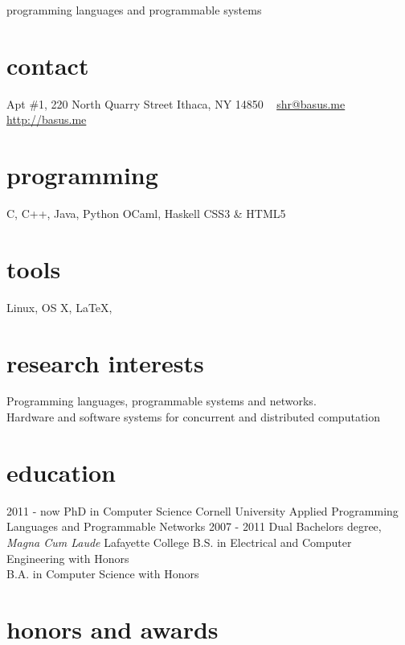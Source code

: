 \documentclass[print]{cv}
\begin{document}
       {programming languages and programmable systems}


\begin{aside}
  \section{contact}
    Apt \#1, 220 North Quarry Street
    Ithaca, NY 14850
    ~
    \href{mailto:shr@basus.me}{\hreffont shr@basus.me}
    \href{http://basus.me}{\hreffont http://basus.me}
  \section{programming}
    C, C++, Java, Python
    OCaml, Haskell
    CSS3 \& HTML5
  \section{tools}
    Linux, OS X, \LaTeX,
\end{aside}

\section{research interests}

    Programming languages, programmable systems and networks. \\
    Hardware and software systems for concurrent and distributed computation 

\section{education}

\begin{entrylist}
  \entry
    {2011 - now}
    {PhD in Computer Science}
    {Cornell University}
    {Applied Programming Languages and Programmable Networks}
  \entry
    {2007 - 2011}
    {Dual Bachelors degree, \emph{Magna Cum Laude}}
    {Lafayette College}
    {B.S. in Electrical and Computer Engineering with Honors\\
     B.A. in Computer Science with Honors}
\end{entrylist}

\section{honors and awards}
\end{document}
